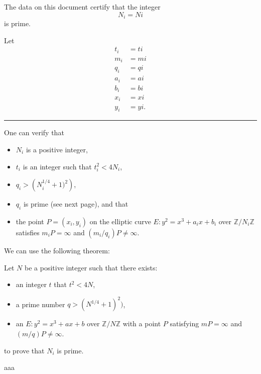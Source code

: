 \pagestyle{empty}
\phantom{a}
\vspace{2em}

\begin{center}
{\Huge {}}
\end{center}
\vspace{2em}

\noindent The data on this document certify that the integer
{\tiny
$$
N_{ {{ i }} } = {{ Ni }}
$$
}
is prime.

\vspace{2em}

\noindent Let
{\tiny
\begin{align*}
t_{ {{ i }} } &= {{ ti }} \\
m_{ {{ i }} } &= {{ mi }} \\
q_{ {{ i }} } &= {{ qi }} \\
a_{ {{ i }} } &= {{ ai }} \\
b_{ {{ i }} } &= {{ bi }} \\
x_{ {{ i }} } &= {{ xi }} \\
y_{ {{ i }} } &= {{ yi }}.
\end{align*}
}

\vspace{0.5em}
\hrule
\vspace{0.5em}

\begin{multicols}{3}
\noindent One can verify that
\begin{itemize}
\item $N_{ {{ i }} }$ is a positive integer,
\item $t_{ {{ i }} }$ is an integer such that $t_{ {{ i }} }^2 < 4N_{ {{ i }} }$,
\item $q_{ {{ i }} } > \left(N_{ {{ i }} }^{1/4} + 1)^2\right)$,
\item $q_{ {{ i }} }$ is prime (see next page), and that
\item the point $P = (x_{ {{ i }} }, y_{ {{ i }} })$ on the elliptic curve $E: y^2 = x^3 + a_{ {{ i }} }x + b_{ {{ i }} }$ over $\mathbb{Z}/{N_{ {{ i }} }}\mathbb{Z}$ satisfies $m_{ {{ i }} }P = \infty$ and $(m_{ {{ i }} }/q_{ {{ i }} })P \neq \infty$.
\end{itemize}
\columnbreak
\noindent We can use the following theorem:
\begin{theorem*}
Let $N$ be a positive integer such that there exists:
\begin{itemize}
\item an integer $t$ that $t^2 < 4N$,
\item a prime number $q > (N^{1/4} + 1)^2)$,
\item an $E: y^2 = x^3 + ax + b$ over $\mathbb{Z}/{N}\mathbb{Z}$ with a point $P$ satisfying $mP = \infty$ and $(m/q)P \neq \infty$.
\end{itemize}
\end{theorem*}
\noindent to prove that $N_{ {{ i }} }$ is prime.

\columnbreak

aaa
\end{multicols}

\newpage